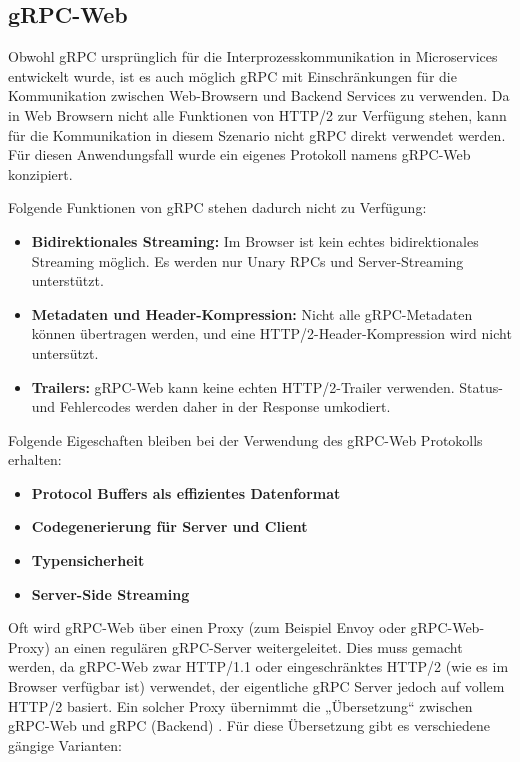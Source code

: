 \clearpage
\subsection{gRPC-Web}
Obwohl gRPC ursprünglich für die Interprozesskommunikation in Microservices entwickelt wurde, ist es auch möglich gRPC mit Einschränkungen für die Kommunikation zwischen Web-Browsern und Backend Services zu verwenden.
Da in Web Browsern nicht alle Funktionen von HTTP/2 zur Verfügung stehen, kann für die Kommunikation in diesem Szenario nicht gRPC direkt verwendet werden. Für diesen Anwendungsfall wurde ein eigenes Protokoll namens gRPC-Web konzipiert. 
 

Folgende Funktionen von gRPC stehen dadurch nicht zu Verfügung:

\begin{itemize}
	\item \textbf{Bidirektionales Streaming:} 
	Im Browser ist kein echtes bidirektionales Streaming möglich. 
	Es werden nur Unary RPCs und Server-Streaming unterstützt.
	
	\item \textbf{Metadaten und Header-Kompression:} 
	Nicht alle gRPC-Metadaten können übertragen werden, und eine HTTP/2-Header-Kompression wird nicht untersützt.
	
	\item \textbf{Trailers:} 
	gRPC-Web kann keine echten HTTP/2-Trailer verwenden. 
	Status- und Fehlercodes werden daher in der Response umkodiert.
\end{itemize}

Folgende Eigeschaften bleiben bei der Verwendung des gRPC-Web Protokolls erhalten:

\begin{itemize}
	\item \textbf{Protocol Buffers als effizientes Datenformat} 
	\item \textbf{Codegenerierung für Server und Client} 
	\item \textbf{Typensicherheit}
	\item \textbf{Server-Side Streaming} 	
\end{itemize}



Oft wird gRPC-Web über einen Proxy (zum Beispiel Envoy oder gRPC-Web-Proxy) an einen regulären gRPC-Server weitergeleitet. Dies muss gemacht werden, da gRPC-Web zwar HTTP/1.1 oder eingeschränktes HTTP/2 (wie es im Browser verfügbar ist) verwendet, der eigentliche gRPC Server jedoch auf vollem HTTP/2 basiert. Ein solcher Proxy übernimmt die „Übersetzung“ zwischen gRPC-Web und gRPC (Backend) \parencite{Brandhorst2019}. Für diese Übersetzung gibt es verschiedene gängige Varianten:

